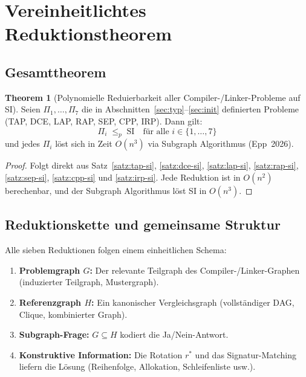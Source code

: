 ﻿\documentclass[a4paper,12pt]{article}
\theoremstyle{definition}
\newtheorem{theorem}{Theorem}
\begin{document}
\section{Vereinheitlichtes Reduktionstheorem}

\subsection{Gesamttheorem}

\begin{theorem}[Polynomielle Reduierbarkeit aller Compiler-/Linker-Probleme auf SI]
\label{thm:gesamt}
Seien $\Pi_1, \ldots, \Pi_7$ die in Abschnitten~\ref{sec:typ}--\ref{sec:init} definierten Probleme (TAP, DCE, LAP, RAP, SEP, CPP, IRP). Dann gilt:
\[
\Pi_i \;\leq_p\; \text{SI} \quad \text{für alle } i \in \{1, \ldots, 7\}
\]
und jedes $\Pi_i$ löst sich in Zeit $O(n^3)$ via Subgraph Algorithmus (Epp~2026).
\end{theorem}

\begin{proof}
Folgt direkt aus Satz~\ref{satz:tap-si}, \ref{satz:dce-si}, \ref{satz:lap-si}, \ref{satz:rap-si}, \ref{satz:sep-si}, \ref{satz:cpp-si} und \ref{satz:irp-si}. Jede Reduktion ist in $O(n^2)$ berechenbar, und der Subgraph Algorithmus löst SI in $O(n^3)$.
\end{proof}

\subsection{Reduktionskette und gemeinsame Struktur}

Alle sieben Reduktionen folgen einem einheitlichen Schema:

\begin{enumerate}
    \item \textbf{Problemgraph $G$:} Der relevante Teilgraph des Compiler-/Linker-Graphen (induzierter Teilgraph, Mustergraph).
    \item \textbf{Referenzgraph $H$:} Ein kanonischer Vergleichsgraph (vollständiger DAG, Clique, kombinierter Graph).
    \item \textbf{Subgraph-Frage:} $G \subseteq H$ kodiert die Ja/Nein-Antwort.
    \item \textbf{Konstruktive Information:} Die Rotation $r^*$ und das Signatur-Matching liefern die Lösung (Reihenfolge, Allokation, Schleifenliste usw.).
\end{enumerate}
\end{document}
